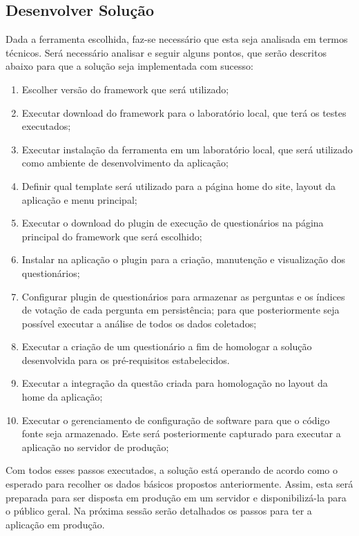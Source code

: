 %
\subsection{Desenvolver Solução}
\label{sub:definir_tecnologia}

Dada a ferramenta escolhida, faz-se necessário que esta seja analisada em termos técnicos. Será necessário analisar e seguir alguns pontos, que
serão descritos abaixo para que a solução seja implementada com sucesso:

\begin{enumerate}
    \item Escolher versão do framework que será utilizado;
    \item Executar download do framework para o laboratório local, que terá os testes executados;
    \item Executar instalação da ferramenta em um laboratório local, que será utilizado como ambiente de
        desenvolvimento da aplicação;
    \item Definir qual template será utilizado para a página home do site, layout da aplicação e menu principal;
    \item Executar o download do plugin de execução de questionários na página principal do framework que será escolhido;
    \item Instalar na aplicação o plugin para a criação, manutenção e visualização dos questionários;
    \item Configurar plugin de questionários para armazenar as perguntas e os índices de votação de cada pergunta em persistência;
        para que posteriormente seja possível executar a análise de todos os dados coletados;
    \item Executar a criação de um questionário a fim de homologar a solução desenvolvida para os pré-requisitos estabelecidos. 
    \item Executar a integração da questão criada para homologação no layout da home da aplicação;
    \item Executar o gerenciamento de configuração de software para que o código fonte seja armazenado. Este será posteriormente
        capturado para executar a aplicação no servidor de produção;
\end{enumerate}

Com todos esses passos executados, a solução está operando de acordo como o esperado para recolher os dados básicos propostos anteriormente.
Assim, esta será preparada para ser disposta em produção em um servidor e disponibilizá-la para o público geral. Na próxima sessão serão
detalhados os passos para ter a aplicação em produção.

